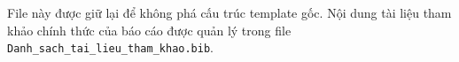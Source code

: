 \documentclass[../DoAn.tex]{subfiles}
\begin{document}
File này được giữ lại để không phá cấu trúc template gốc. Nội dung tài liệu tham khảo chính thức của báo cáo được quản lý trong file \texttt{Danh\_sach\_tai\_lieu\_tham\_khao.bib}.
\end{document}
